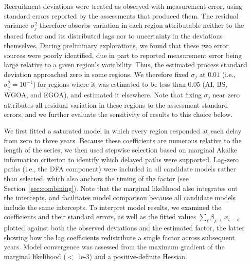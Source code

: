 \documentclass[12pt]{article}
\begin{document}
Recruitment deviations were treated as observed with measurement error,
using standard errors reported by the assessments that produced them.
The residual variance $\sigma_j^2$ therefore absorbs variation in each
region attributable neither to the shared factor and its distributed
lags nor to uncertainty in the deviations themselves. During preliminary
explorations, we found that these two error sources were poorly
identified, due in part to reported measurement error being large
relative to a given region's variability. Thus, the estimated process
standard deviation approached zero in some regions. We therefore fixed
$\sigma_j$ at $0.01$ (i.e., $\sigma_j^2 = 10^{-4}$) for regions where it
was estimated to be less than 0.05 (AI, BS, WGOA, and EGOA), and
estimated it elsewhere. Note that fixing $\sigma_j$ near zero attributes
all residual variation in these regions to the assessment standard
errors, and we further evaluate the sensitivity of results to this choice below.

We first fitted a saturated model in which every region responded at
each delay from zero to three years. Because these coefficients are
numerous relative to the length of the series, we then used stepwise
selection based on marginal Akaike information criterion to identify
which delayed paths were supported. Lag-zero paths (i.e., the DFA
component) were included in all candidate models rather than selected,
which also anchors the timing of the factor (see
Section~\ref{sec:combining}). Note that the marginal likelihood also
integrates out the intercepts, and facilitates model comparison because
all candidate models include the same intercepts. To interpret
model results, we examined the coefficients and their standard errors,
as well as the fitted values $\sum_{\ell} \beta_{j,\ell}\, x_{t-\ell}$
plotted against both the observed deviations and the estimated factor,
the latter showing how the lag coefficients redistribute a single factor
across subsequent years. Model
convergence was assessed from the maximum gradient of the marginal
likelihood ($<$ 1e-3) and a positive-definite Hessian.
\end{document}
